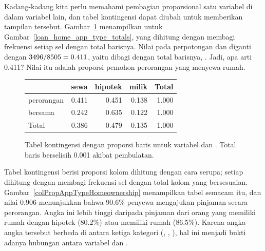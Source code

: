 Kadang-kadang kita perlu memahami pembagian proporsional
satu variabel di dalam variabel lain,
dan tabel kontingensi dapat diubah untuk memberikan tampilan tersebut.
Gambar~\ref{rowPropAppTypeHomeownership}
menampilkan
untuk Gambar~\ref{loan_home_app_type_totals},
yang dihitung dengan membagi frekuensi setiap sel dengan total barisnya.
Nilai \loanapphomeAA{} pada perpotongan
 dan  diganti dengan
$3496{}/8505{} = 0.411$,
yaitu \loanapphomeAA{} dibagi dengan total barisnya,
\loanapphomeAD{}.
Jadi, apa arti 0.411?
Nilai itu adalah proporsi pemohon perorangan yang menyewa rumah.

\begin{figure}[h]
\centering
\begin{tabular}{l rrr r}
  \hline
  & sewa & hipotek & milik & Total \\
  \hline
  perorangan & 
      0.411 &
      0.451 &
      0.138 &
      1.000 \\
  bersama &
      0.242 &
      0.635 &
      0.122 &
      1.000 \\
  \hline
  Total &
      0.386 &
      0.479 &
      0.135 &
      1.000 \\
  \hline
\end{tabular}
\caption{Tabel kontingensi dengan proporsi baris
    untuk variabel  dan
    .
    Total baris  berselisih 0.001
    akibat pembulatan.}
\label{rowPropAppTypeHomeownership}
\end{figure}

Tabel kontingensi berisi proporsi kolom dihitung dengan cara serupa;
setiap
dihitung dengan membagi frekuensi sel dengan total kolom yang bersesuaian.
Gambar~\ref{colPropAppTypeHomeownership} menampilkan tabel semacam itu,
dan nilai 0.906 menunjukkan bahwa 90.6\% penyewa mengajukan
pinjaman secara perorangan.
Angka ini lebih tinggi daripada pinjaman dari orang yang
memiliki rumah dengan hipotek (80.2\%) atau memiliki rumah (86.5\%).
Karena angka-angka tersebut berbeda di antara ketiga kategori
 (, , ),
hal ini menjadi bukti adanya hubungan antara variabel
 dan .

